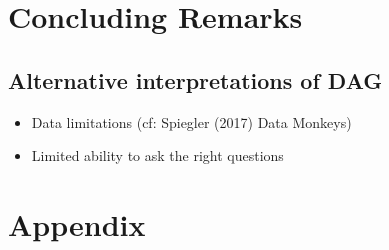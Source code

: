\documentclass[11pt,a4paper,dvipdfmx]{article}
\theoremstyle{plain}
\begin{document}
\section{Concluding Remarks}
\subsection{Alternative interpretations of DAG}
\begin{itemize}
	\item Data limitations (cf: Spiegler (2017) Data Monkeys)
	\item Limited ability to ask the right questions
\end{itemize}


\newpage
\section{Appendix}
\end{document}
